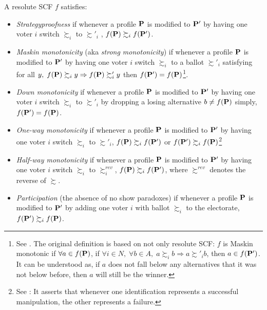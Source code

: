 \begin{definition}
    A resolute SCF $f$ satisfies:
    \begin{itemize}
        \item \textit{Strategyproofness} if whenever a profile $\mathbf{P}$ is modified to $\mathbf{P}'$ by having one voter $i$ switch $\succsim_i$ to $\succsim'_i$ , $f(\mathbf{P}) \succsim_i f(\mathbf{P}')$.
        \item \textit{Maskin monotonicity} (aka \textit{strong monotonicity}) if whenever a profile $\mathbf{P}$ is modified to $\mathbf{P}'$ by having one voter $i$ switch $\succsim_i$ to a ballot $\succsim'_i$ satisfying for all $y,\; f(\mathbf{P}) \succsim_i y \Rightarrow f(\mathbf{P}) \succsim'_i y$ then $f(\mathbf{P}') = f(\mathbf{P})$\footnote{See \textcite{maskin1999}. The original definition is based on not only resolute SCF: $f$ is Maskin monotonic if $\forall a \in f(\mathbf{P})$, if $\forall i \in N,\; \forall b \in A,\; a \succsim_i b \Rightarrow a \succsim'_i b$, then $a \in f(\mathbf{P}')$. It can be understood as, if $a$ does not fall below any alternatives that it was not below before, then $a$ will still be the winner.}.
        \item \textit{Down monotonicity} if whenever a profile $\mathbf{P}$ is modified to $\mathbf{P}'$ by having one voter $i$ switch $\succsim_i$ to $\succsim'_i$ by dropping a losing alternative $b \neq f(\mathbf{P})$ simply, $f(\mathbf{P}') = f(\mathbf{P})$.
        \item \textit{One-way monotonicity} if whenever a profile $\mathbf{P}$ is modified to $\mathbf{P}'$ by having one voter $i$ switch $\succsim_i$ to $\succsim'_i$, $f(\mathbf{P}) \succsim_i f(\mathbf{P}')$ or $f(\mathbf{P}') \succsim_i f(\mathbf{P})$\footnote{See \textcite{sanver_one-way_2009}: It asserts that whenever one identification represents a successful manipulation, the other represents a failure.}
        \item \textit{Half-way monotonicity} if whenever a profile $\mathbf{P}$ is modified to $\mathbf{P}'$ by having one voter $i$ switch $\succsim_i$ to $\succsim^{rev}_i$, $f(\mathbf{P}) \succsim_i f(\mathbf{P}')$, where $\succsim^{rev}$ denotes the reverse of $\succsim$.
        \item \textit{Participation} (the absence of no show paradoxes) if whenever a profile $\mathbf{P}$ is modified to $\mathbf{P}'$ by adding one voter $i$ with ballot $\succsim_i$ to the electorate, $f(\mathbf{P}') \succsim_i f(\mathbf{P})$.
    \end{itemize}
\end{definition}

